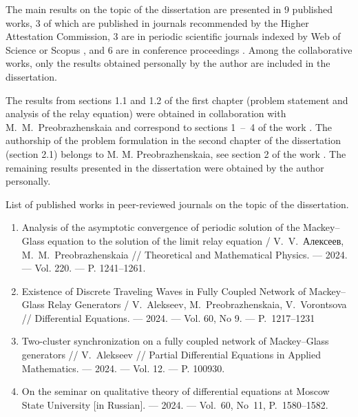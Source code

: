 

\bigskip

{\publications} The main results on the topic of the dissertation are presented in 9 published works, 3 of which \cite{wosbib1,wosbib2,scbib1} are published in journals recommended by the Higher Attestation Commission, 3 are in periodic scientific journals indexed by Web of Science or Scopus \cite{wosbib1,wosbib2,scbib1}, and 6 are in conference proceedings \cite{confbib1,confbib2,confbib3,confbib4,confbib5,confbib6}. Among the collaborative works, only the results obtained personally by the author are included in the dissertation.

{\contribution} The results from sections 1.1 and 1.2 of the first chapter (problem statement and analysis of the relay equation) were obtained in collaboration with M.~M.~Preobrazhenskaia and correspond to sections 1~--~4 of the work \cite{wosbib1}. The authorship of the problem formulation in the second chapter of the dissertation (section 2.1) belongs to M. M. Preobrazhenskaia, see section 2 of the work \cite{wosbib2}. The remaining results presented in the dissertation were obtained by the author personally.

List of published works in peer-reviewed journals on the topic of the dissertation.
\begin{enumerate}
	\item Analysis of the asymptotic convergence of periodic solution of the Mackey–Glass equation to the solution of the limit relay equation / V.~V.~Алексеев, M.~M.~Preobrazhenskaia // Theoretical and Mathematical Physics. --- 2024. --- Vol. 220. --- P. 1241--1261. \cite{wosbib1}
	\item Existence of Discrete Traveling Waves in Fully Coupled Network of Mackey--Glass Relay Generators / V.~Alekseev, M.~Preobrazhenskaia, V.~Vorontsova // Differential Equations. --- 2024. --- Vol. 60, No 9. --- P.~1217--1231 \cite{wosbib2}
	\item Two-cluster synchronization on a fully coupled network of Mackey--Glass generators // V.~Alekseev // Partial Differential Equations in Applied Mathematics. --- 2024. --- Vol. 12. --- P. 100930. \cite{scbib1}
	\item On the seminar on qualitative theory of differential equations at Moscow State University [in Russian]. --- 2024. --- Vol.~60, No~11, P.~1580--1582. \cite{Sergeev2024}
\end{enumerate}

